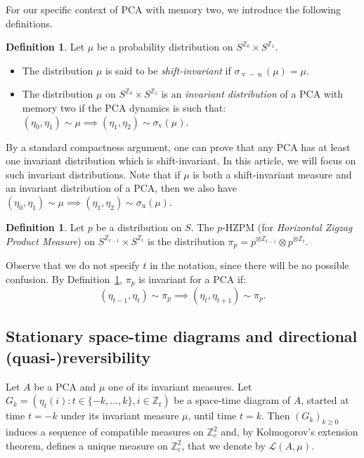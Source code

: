 \documentclass[10pt]{amsart}
\theoremstyle{definition}\newtheorem{defi}[theo]{Definition}\newtheorem{rema}[theo]{Remark}\newtheorem{exam}[theo]{Example}\newtheorem{exem}[theo]{Example}\newtheorem{nota}[theo]{Notation}
\newcounter{a}
\newcommand{\ZZ}{\mathbb{Z}}
\newcommand{\Z}{\mathbb{Z}}
\renewcommand{\L}{\mathcal{L}}
\DeclareMathOperator{\vu}{u}
\DeclareMathOperator{\vv}{v}
\newtheorem{definition}[theo]{Definition}
\begin{document}
For our specific context of PCA with memory two, we introduce the following definitions.

\begin{definition}\label{def:prob-inv}
Let $\mu$ be a probability distribution on $S^{\Z_{0}}\times S^{\Z_{1}}$.
\begin{itemize}
\item The distribution $\mu$ is said to be \emph{shift-invariant} if $\sigma_{\vv-\vu}(\mu)=\mu$.

\item The distribution $\mu$ on $S^{\Z_{0}}\times S^{\Z_{1}}$ is an \emph{invariant distribution} of a PCA with memory two if the PCA dynamics is such that: $(\eta_{0},\eta_{1}) \sim \mu \implies (\eta_{1},\eta_{2}) \sim \sigma_{\vv}(\mu).$

\end{itemize}
\end{definition}

By a standard compactness argument, one can prove that any PCA has at least one invariant distribution which is shift-invariant. In this article, we will focus on such invariant distributions. Note that if $\mu$ is both a shift-invariant measure and an invariant distribution of a PCA, then we also have $(\eta_{0},\eta_{1}) \sim \mu \implies (\eta_{1},\eta_{2}) \sim \sigma_{\vu}(\mu).$

\begin{defi}
Let $p$ be a distribution on $S$. The $p$-HZPM (for \emph{Horizontal Zigzag Product Measure}) on $S^{\Z_{t-1}}\times S^{\Z_{t}}$ is the distribution $\pi_p=p^{\otimes\Z_{t-1}}\otimes p^{\otimes\Z_t}$.
\end{defi}

Observe that we do not specify $t$ in the notation, since there will be no possible confusion. By Definition~\ref{def:prob-inv}, $\pi_p$ is invariant for a PCA if:
\[
(\eta_{t-1},\eta_t) \sim \pi_p \implies (\eta_{t},\eta_{t+1}) \sim \pi_p.
\]

\subsection{Stationary space-time diagrams and directional (quasi-)reversibility}\label{ssec:sstd}

Let $A$ be a PCA and $\mu$ one of its invariant measures. Let $G_k = (\eta_t(i) : t \in \{-k,\dots,k\}, i \in \ZZ_t)$ be a space-time diagram of $A$, started at time $t=-k$ under its invariant measure $\mu$, until time $t=k$. Then $(G_k)_{k\geq 0}$ induces a sequence of compatible measures on $\Z_{e}^2$ and, by Kolmogorov's extension theorem, defines a unique measure on $\Z_{e}^2$, that we denote by $\L(A,\mu)$.
\end{document}
